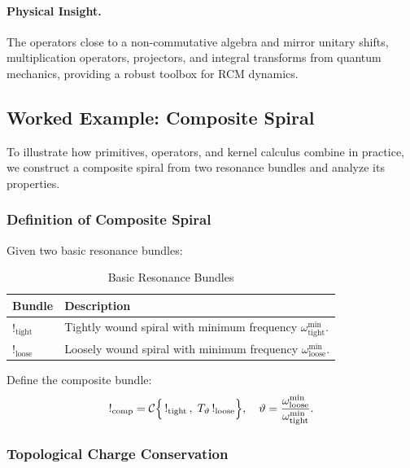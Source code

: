 \paragraph{Physical Insight.}  
The operators close to a non-commutative algebra and mirror unitary shifts, multiplication operators, projectors, and integral transforms from quantum mechanics, providing a robust toolbox for RCM dynamics.


\subsection{Worked Example: Composite Spiral}

To illustrate how primitives, operators, and kernel calculus combine in practice, we construct a composite spiral from two resonance bundles and analyze its properties.

\subsubsection{Definition of Composite Spiral}

Given two basic resonance bundles:

\begin{table}[H]
  \centering
  \caption{Basic Resonance Bundles}
  \label{tab:composite-bundles}
  \begin{tabular}{@{}ll@{}}
    \toprule
    \textbf{Bundle} & \textbf{Description} \\
    \midrule
    $!_{\mathrm{tight}}$ & Tightly wound spiral with minimum frequency $\omega_{\mathrm{tight}}^{\min}$. \\
    $!_{\mathrm{loose}}$ & Loosely wound spiral with minimum frequency $\omega_{\mathrm{loose}}^{\min}$. \\
    \bottomrule
  \end{tabular}
\end{table}

Define the composite bundle:
\begin{equation}
  !_{\mathrm{comp}}
  = \mathcal{C}\Bigl\{\,!_{\mathrm{tight}}\,,\;T_{\vartheta}\,!_{\mathrm{loose}}\Bigr\},
  \quad
  \vartheta = \frac{\omega_{\mathrm{loose}}^{\min}}{\omega_{\mathrm{tight}}^{\min}}.
\end{equation}

\subsubsection{Topological Charge Conservation}

